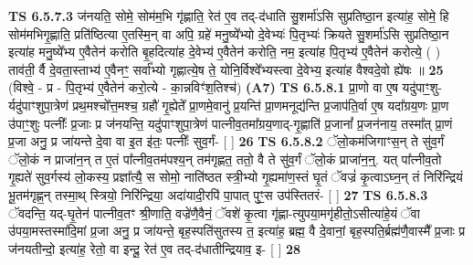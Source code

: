 \documentclass[17pt]{extarticle}
\begin{document}
                  \newline
                                \textbf{ TS 6.5.7.3} \newline
                  ज॑नयति॒ सोमे॒ सोम॑म॒भि गृ॑ह्णाति॒ रेत॑ ए॒व तद्-द॑धाति सु॒शर्मा॑ऽसि सुप्रतिष्ठा॒न इत्या॑ह॒ सोमे॒ हि सोम॑मभिगृ॒ह्णाति॒ प्रति॑ष्ठित्या ए॒तस्मि॒न् वा अपि॒ ग्रहे॑ मनु॒ष्ये᳚भ्यो दे॒वेभ्यः॑ पि॒तृभ्यः॑ क्रियते सु॒शर्मा॑ऽसि सुप्रतिष्ठा॒न इत्या॑ह मनु॒ष्ये᳚भ्य ए॒वैतेन॑ करोति बृ॒हदित्या॑ह दे॒वेभ्य॑ ए॒वैतेन॑ करोति॒ नम॒ इत्या॑ह पि॒तृभ्य॑ ए॒वैतेन॑ करोत्ये॒ ( ) ताव॑ती॒ र्वै दे॒वता॒स्ताभ्य॑ ए॒वैनꣳ॒॒ सर्वा᳚भ्यो गृह्णात्ये॒ष ते॒ योनि॒र्विश्वे᳚भ्यस्त्वा दे॒वेभ्य॒ इत्या॑ह वैश्वदे॒वो ह्ये॑षः ॥ \textbf{  25 } \newline
                  \newline
                      (विश्वे॒ - प्र - पि॒तृभ्य॑ ए॒वैतेन॑ करो॒त्ये - का॒न्नविꣳ॑श॒तिश्च॑)  \textbf{(A7)} \newline \newline
                                        \textbf{ TS 6.5.8.1} \newline
                  प्रा॒णो वा ए॒ष यदु॑पाꣳ॒॒शु-र्यदु॑पाꣳशुपा॒त्रेण॑ प्रथ॒मश्चो᳚त्त॒मश्च॒ ग्रहौ॑ गृ॒ह्येते᳚ प्रा॒णमे॒वानु॑ प्र॒यन्ति॑ प्रा॒णमनूद्य॑न्ति प्र॒जाप॑ति॒र्वा ए॒ष यदा᳚ग्रय॒णः प्रा॒ण उ॑पाꣳ॒॒शुः पत्नीः᳚ प्र॒जाः प्र ज॑नयन्ति॒ यदु॑पाꣳशुपा॒त्रेण॑ पात्नीव॒तमा᳚ग्रय॒णाद्-गृ॒ह्णाति॑ प्र॒जानां᳚ प्र॒जन॑नाय॒ तस्मा᳚त् प्रा॒णं प्र॒जा अनु॒ प्र जा॑यन्ते दे॒वा वा इ॒त इ॑तः॒ पत्नीः᳚ सुव॒र्गं- [  ] \textbf{  26} \newline
                  \newline
                                \textbf{ TS 6.5.8.2} \newline
                  ॅलो॒कम॑जिगाꣳस॒न् ते सु॑व॒र्गं ॅलो॒कं न प्राजा॑न॒न् त ए॒तं पा᳚त्नीव॒तम॑पश्य॒न् तम॑गृह्णत॒ ततो॒ वै ते सु॑व॒र्गं ॅलो॒कं प्राजा॑न॒न्॒. यत् पा᳚त्नीव॒तो गृ॒ह्यते॑ सुव॒र्गस्य॑ लो॒कस्य॒ प्रज्ञा᳚त्यै॒ स सोमो॒ नाति॑ष्ठत स्त्री॒भ्यो गृ॒ह्यमा॑ण॒स्तं घृ॒तं ॅवज्रं॑ कृ॒त्वाऽघ्न॒न् तं निरि॑न्द्रियं भू॒तम॑गृह्ण॒न् तस्मा॒थ् स्त्रियो॒ निरि॑न्द्रिया॒ अदा॑यादी॒रपि॑ पा॒पात् पुꣳ॒॒स उप॑स्तितरं- [  ] \textbf{  27} \newline
                  \newline
                                \textbf{ TS 6.5.8.3} \newline
                  ॅवदन्ति॒ यद्-घृ॒तेन॑ पात्नीव॒तꣳ श्री॒णाति॒ वज्रे॑णै॒वैनं॒ ॅवशे॑ कृ॒त्वा गृ॑ह्णा-त्युपया॒मगृ॑हीतो॒ऽसीत्या॑हे॒यं ॅवा उ॑पया॒मस्तस्मा॑दि॒मां प्र॒जा अनु॒ प्र जा॑यन्ते॒ बृह॒स्पति॑सुतस्य त॒ इत्या॑ह॒ ब्रह्म॒ वै दे॒वानां॒ बृह॒स्पति॒र्ब्रह्म॑णै॒वास्मै᳚ प्र॒जाः प्र ज॑नयतीन्दो॒ इत्या॑ह॒ रेतो॒ वा इन्दू॒ रेत॑ ए॒व तद्-द॑धातीन्द्रियाव॒ इ- [  ] \textbf{  28} \newline
\end{document}
